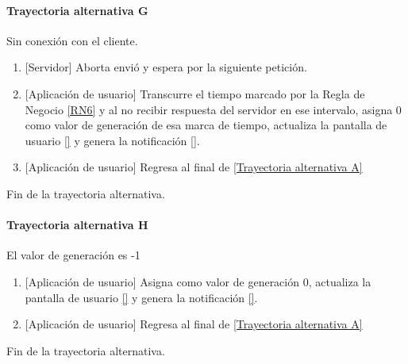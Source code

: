 \paragraph{Trayectoria alternativa G} \label{SUB-M-CU5:TG}
	Sin conexión con el cliente.
	\begin{enumerate}[label=G\arabic*.]
		\item {[Servidor]} Aborta envió y espera por la siguiente petición.
		\item {[Aplicación de usuario]} Transcurre el tiempo marcado por la Regla de Negocio \ref{RN6} y al no recibir respuesta del servidor en ese intervalo, asigna 0 como valor de generación de esa marca de tiempo, actualiza la pantalla de usuario \ref{} y genera la notificación \ref{}.
		\item {[Aplicación de usuario]} Regresa al final de \hyperref[SUB-M-CU5:TA]{[Trayectoria alternativa A]}
	\end{enumerate}
	Fin de la trayectoria alternativa.
	
\paragraph{Trayectoria alternativa H} \label{SUB-M-CU5:TH}
	El valor de generación es -1
	\begin{enumerate}[label=H\arabic*.]
		\item {[Aplicación de usuario]} Asigna como valor de generación 0, actualiza la pantalla de usuario \ref{} y genera la notificación \ref{}.
		\item {[Aplicación de usuario]} Regresa al final de \hyperref[SUB-M-CU5:TA]{[Trayectoria alternativa A]}
	\end{enumerate}
	Fin de la trayectoria alternativa.